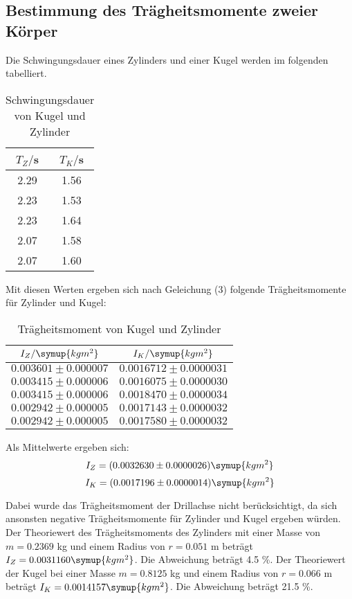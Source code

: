 \subsection{Bestimmung des Trägheitsmomente zweier Körper}
Die Schwingungsdauer eines Zylinders und einer Kugel werden im folgenden tabelliert.
\begin{table}[H]
  \centering
  \caption{Schwingungsdauer von Kugel und Zylinder}
  \label{tab:Schwingungsdauer von Kugel und Zylinder}
  \begin{tabular}{c c}
    \toprule
    $T_Z/$s & $T_K/$s \\
    \midrule
    2.29 & 1.56 \\
    2.23 & 1.53 \\
    2.23 & 1.64 \\
    2.07 & 1.58 \\
    2.07 & 1.60 \\
    \bottomrule
  \end{tabular}
\end{table}

Mit diesen Werten ergeben sich nach Geleichung (3) folgende Trägheitsmomente
für Zylinder und Kugel:
\begin{table}[H]
  \centering
  \caption{Trägheitsmoment von Kugel und Zylinder}
  \label{tab:Trägheitsmoment von Kugel und Zylinder}
  \begin{tabular}{c c}
    \toprule
    $I_Z/\symup{kgm^2}$ & $I_K/\symup{kgm^2}$ \\
    \midrule
    $0.003601 \pm 0.000007$ & $0.0016712 \pm 0.0000031$ \\
    $0.003415 \pm 0.000006$ & $0.0016075 \pm 0.0000030$ \\
    $0.003415 \pm 0.000006$ & $0.0018470 \pm 0.0000034$ \\
    $0.002942 \pm 0.000005$ & $0.0017143 \pm 0.0000032$ \\
    $0.002942 \pm 0.000005$ & $0.0017580 \pm 0.0000032$ \\
    \bottomrule
  \end{tabular}
\end{table}

Als Mittelwerte ergeben sich:
\begin{equation}
  I_Z = (0.0032630 \pm 0.0000026) \symup{kgm^2}
\end{equation}
\begin{equation}
  I_K = (0.0017196 \pm 0.0000014) \symup{kgm^2}
\end{equation}

Dabei wurde das Trägheitsmoment der Drillachse nicht berücksichtigt, da sich
ansonsten negative Trägheitsmomente für Zylinder und Kugel ergeben würden.
Der Theoriewert des Trägheitsmoments des Zylinders mit einer Masse von $m=0.2369$ kg und einem Radius von
$r=0.051$ m beträgt $I_Z = 0.0031160 \symup{kgm^2}$. Die Abweichung beträgt 4.5 \%.
Der Theoriewert der Kugel bei einer Masse $m = 0.8125$ kg und einem Radius von $r = 0.066$ m
beträgt $I_K = 0.0014157 \symup{kgm^2}$. Die Abweichung beträgt 21.5 \%.


